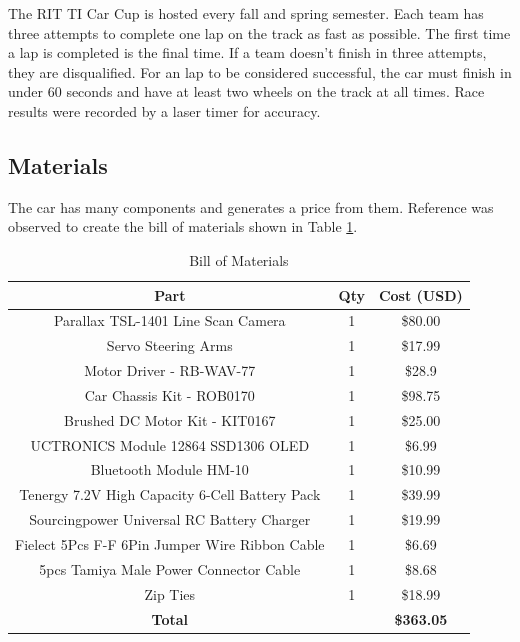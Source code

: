 \documentclass[conference]{IEEEtran}
\begin{document}
The RIT TI Car Cup is hosted every fall and spring semester. Each team has three attempts to complete one lap on the track as fast as possible. The first time a lap is completed is the final time. If a team doesn't finish in three attempts, they are disqualified. For an lap to be considered successful, the car must finish in under 60 seconds and have at least two wheels on the track at all times. Race results were recorded by a laser timer for accuracy.

\subsection{Materials}

The car has many components and generates a price from them. Reference \cite{carCup2022} was observed to create the bill of materials shown in Table \ref{table:billOfMaterials}.

\begin{table}[htbp]
\caption{Bill of Materials}
\begin{center}
\begin{tabular}{|c|c|c|}
\hline
Part & Qty & Cost (USD) \\
\hline
Parallax TSL-1401 Line Scan Camera & 1 & \$80.00 \\
\hline
Servo Steering Arms & 1 & \$17.99 \\
\hline
Motor Driver - RB-WAV-77 & 1 & \$28.9 \\
\hline
Car Chassis Kit - ROB0170 & 1 & \$98.75 \\
\hline
Brushed DC Motor Kit - KIT0167 & 1 & \$25.00 \\
\hline
UCTRONICS Module 12864 SSD1306 OLED & 1 & \$6.99 \\
\hline
Bluetooth Module HM-10 & 1 & \$10.99 \\
\hline
Tenergy 7.2V High Capacity 6-Cell Battery Pack & 1 & \$39.99 \\
\hline
Sourcingpower Universal RC Battery Charger & 1 & \$19.99 \\
\hline
Fielect 5Pcs F-F 6Pin Jumper Wire Ribbon Cable & 1 & \$6.69 \\
\hline
5pcs Tamiya Male Power Connector Cable & 1 & \$8.68 \\
\hline
Zip Ties & 1 & \$18.99 \\
\hline
\textbf{Total} & & \textbf{\$363.05} \\
\hline
\end{tabular}
\label{table:billOfMaterials}
\end{center}
\end{table}
\end{document}
